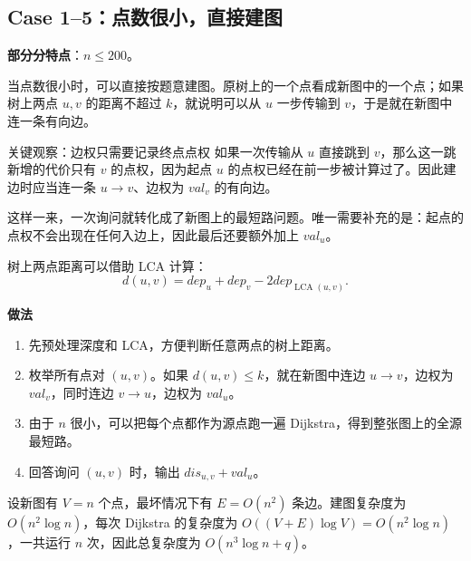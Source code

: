 \documentclass{book}
\begin{document}
\newpage
\subsection{Case 1--5：点数很小，直接建图}
    \textbf{部分分特点}：$n\le 200$。

    当点数很小时，可以直接按题意建图。原树上的一个点看成新图中的一个点；如果树上两点 $u,v$ 的距离不超过 $k$，就说明可以从 $u$ 一步传输到 $v$，于是就在新图中连一条有向边。

\begin{keybox}{关键观察：边权只需要记录终点点权}
如果一次传输从 $u$ 直接跳到 $v$，那么这一跳新增的代价只有 $v$ 的点权，因为起点 $u$ 的点权已经在前一步被计算过了。因此建边时应当连一条 $u\to v$、边权为 $val_v$ 的有向边。
\end{keybox}

    这样一来，一次询问就转化成了新图上的最短路问题。唯一需要补充的是：起点的点权不会出现在任何入边上，因此最后还要额外加上 $val_u$。

    树上两点距离可以借助 LCA 计算：
    \[
    d(u,v)=dep_u+dep_v-2dep_{\operatorname{LCA}(u,v)}.
    \]

    \par\medskip
    \noindent\textbf{做法}
    \par\medskip

    \begin{enumerate}[leftmargin=2em,itemsep=1pt,topsep=2pt,parsep=0pt,partopsep=0pt]
        \item 先预处理深度和 LCA，方便判断任意两点的树上距离。
        \item 枚举所有点对 $(u,v)$。如果 $d(u,v)\le k$，就在新图中连边 $u\to v$，边权为 $val_v$，同时连边 $v\to u$，边权为 $val_u$。
        \item 由于 $n$ 很小，可以把每个点都作为源点跑一遍 Dijkstra，得到整张图上的全源最短路。
        \item 回答询问 $(u,v)$ 时，输出 $dis_{u,v}+val_u$。
    \end{enumerate}

    设新图有 $V=n$ 个点，最坏情况下有 $E=O(n^2)$ 条边。建图复杂度为 $O(n^2\log n)$，每次 Dijkstra 的复杂度为 $O((V+E)\log V)=O(n^2\log n)$，一共运行 $n$ 次，因此总复杂度为 $O(n^3\log n+q)$。
\end{document}
